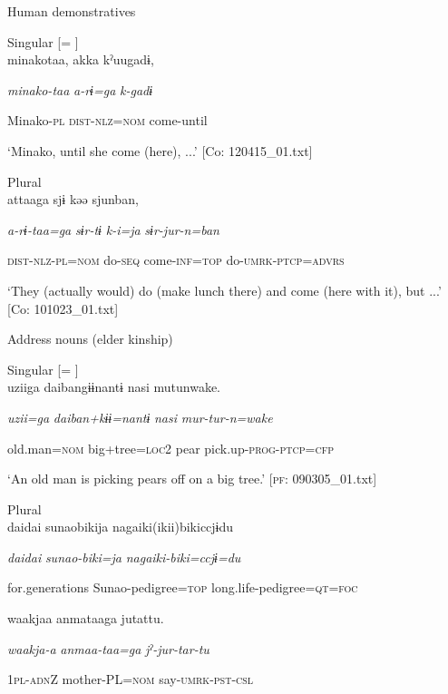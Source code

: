   Human demonstratives

\ex  Singular [= ]\\

{\TM}
\gll minakotaa,  akka  kˀuugadɨ,

      \textit{minako-taa}  \textit{a-rɨ=ga}  \textit{k-gadɨ}

      Minako-\textsc{pl}  \textsc{dist}-\textsc{nlz}=\textsc{nom}  come-until

\glt ‘Minako, until she come (here), ...’ [Co: 120415\_01.txt]
\z

\ex  Plural\\

{\TM}
\gll attaaga  sjɨ  kəə  sjunban,

      \textit{a-rɨ-taa=ga}  \textit{sɨr-tɨ}  \textit{k-i=ja}  \textit{sɨr-jur-n=ban}

      \textsc{dist}-\textsc{nlz}-\textsc{pl}=\textsc{nom}  do-\textsc{seq}  come-\textsc{inf}=\textsc{top}  do-\textsc{umrk}-\textsc{ptcp}=\textsc{advrs}

\glt ‘They (actually would) do (make lunch there) and come (here with it), but ...’ [Co: 101023\_01.txt]
\z

  Address nouns (elder kinship)

\ex  Singular [= ]\\

{\TM}
\gll uziiga  daibangɨɨnantɨ  nasi  mutunwake.

      \textit{uzii=ga}  \textit{daiban+kɨɨ=nantɨ}  \textit{nasi}  \textit{mur-tur-n=wake}

      old.man=\textsc{nom}  big+tree=\textsc{loc}2  pear  pick.up-\textsc{prog}-\textsc{ptcp}=\textsc{cfp}

\glt ‘An old man is picking pears off on a big tree.’ [\textsc{pf}: 090305\_01.txt]
\z

\ex  Plural\\

{\TM}
\gll daidai  sunaobikija  nagaiki(ikii)bikiccjɨdu

      \textit{daidai}  \textit{sunao-biki=ja}  \textit{nagaiki-biki=ccjɨ=du}

      for.generations  Sunao-pedigree=\textsc{top}  long.life-pedigree=\textsc{qt}=\textsc{foc}

      waakjaa  anmataaga  jutattu.

      \textit{waakja-a}  \textit{anmaa-taa=ga}  \textit{jˀ-jur-tar-tu}

      1\textsc{pl}-\textsc{adn}Z  mother-PL=\textsc{nom}  say-\textsc{umrk}-\textsc{pst}-\textsc{csl}

